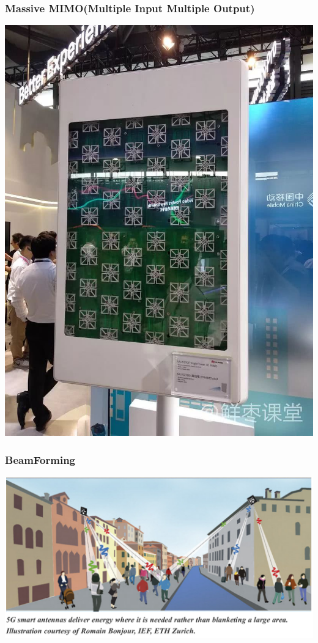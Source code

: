 \documentclass{beamer}
\begin{document}
    \begin{frame}
        \frametitle{Massive MIMO(Multiple Input Multiple Output)}
        \includegraphics[height=0.9\textheight]{img/huawei.jpg}
    \end{frame}

    \begin{frame}
        \frametitle{BeamForming}
        \includegraphics[width=\linewidth]{img/BeamForming.png}
    \end{frame}
\end{document}
